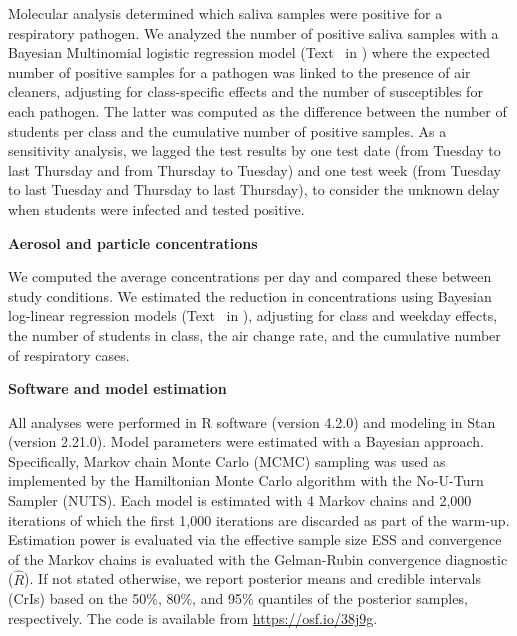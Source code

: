 \documentclass[fleqn,11pt]{wlscirep}
\begin{document}
\noindent Molecular analysis determined which saliva samples were positive for a respiratory pathogen. We analyzed the number of positive saliva samples with a Bayesian Multinomial logistic regression model (Text~ in \supp) where the expected number of positive samples for a pathogen was linked to the presence of air cleaners, adjusting for class-specific effects and the number of susceptibles for each pathogen. The latter was computed as the difference between the number of students per class and the cumulative number of positive samples. As a sensitivity analysis, we lagged the test results by one test date (\ie from Tuesday to last Thursday and from Thursday to Tuesday) and one test week (\ie from Tuesday to last Tuesday and Thursday to last Thursday), to consider the unknown delay when students were infected and tested positive. 

\noindent\textbf{Aerosol and particle concentrations} \smallskip

\noindent We computed the average concentrations per day and compared these between study conditions. We estimated the reduction in concentrations using Bayesian log-linear regression models (Text~ in \supp), adjusting for class and weekday effects, the number of students in class, the air change rate, and the cumulative number of respiratory cases. \medskip


\noindent\textbf{Software and model estimation} \smallskip

\noindent All analyses were performed in R software (version 4.2.0)\cite{RCoreTeam2022} and modeling in Stan (version 2.21.0)\cite{Carpenter2017}. Model parameters were estimated with a Bayesian approach. Specifically, Markov chain Monte Carlo (MCMC) sampling was used as implemented by the Hamiltonian Monte Carlo algorithm with the No-U-Turn Sampler (NUTS)\cite{Hoffman2014}. Each model is estimated with 4 Markov chains and 2,000 iterations of which the first 1,000 iterations are discarded as part of the warm-up. Estimation power is evaluated via the effective sample size ESS and convergence of the Markov chains is evaluated with the Gelman-Rubin convergence diagnostic ($\hat{R}$). If not stated otherwise, we report posterior means and credible intervals (CrIs) based on the 50\%, 80\%, and 95\% quantiles of the posterior samples, respectively. The code is available from \url{https://osf.io/38j9g}.

\end{document}
